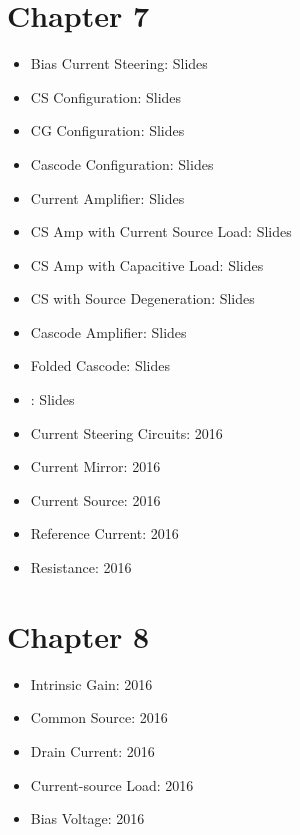 \documentclass[twocolumn]{article}
\begin{document}
  \section*{Chapter 7}
    \begin{itemize}
      \item Bias Current Steering: Slides
      \item CS Configuration: Slides
      \item CG Configuration: Slides
      \item Cascode Configuration: Slides
      \item Current Amplifier: Slides
      \item CS Amp with Current Source Load: Slides
      \item CS Amp with Capacitive Load: Slides
      \item CS with Source Degeneration: Slides
      \item Cascode Amplifier: Slides
      \item Folded Cascode: Slides
      \item : Slides

      \item Current Steering Circuits: 2016
      \item Current Mirror: 2016
      \item Current Source: 2016
      \item Reference Current: 2016
      \item Resistance: 2016
    \end{itemize}
  \section*{Chapter 8}
    \begin{itemize}
      \item Intrinsic Gain: 2016
      \item Common Source: 2016
      \item Drain Current: 2016
      \item Current-source Load: 2016
      \item Bias Voltage: 2016
    \end{itemize}
\end{document}
